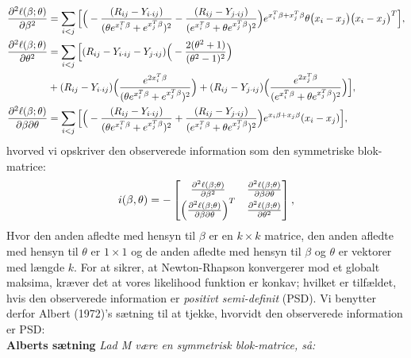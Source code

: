 \documentclass[11pt,a4paper]{article}
\begin{document}
\begin{align}
\frac{\partial^2 \ell(\beta;\theta)}{\partial \beta^2}
&= \sum_{i<j}\Big{[}\Big{(} -\frac{(R_{ij}-Y_{i\cdot ij})}{(\theta e^{x_i^T\beta}+e^{x_j^T\beta})^2}-\frac{(R_{ij}-Y_{j\cdot ij})}{(e^{x_i^T\beta}+\theta e^{x_j^T\beta})^2}\Big{)}e^{x_i^T\beta+x_j^T\beta}\theta\big{(}x_{i}-x_{j}\big{)}\big{(}x_{i}-x_{j}\big{)}^T\Big{]},\label{func:d2db2}\\
\frac{\partial^2 \ell(\beta;\theta)}{\partial \theta^2}
&= \sum_{i<j} 
\Big{[}
(R_{ij}-Y_{i\cdot ij}-Y_{j\cdot ij})\Big{(}-\frac{2(\theta^2+1)}{(\theta^2-1)^2}\Big{)}\\ \nonumber
&+(R_{ij}-Y_{i\cdot ij})\Big{(}\frac{e^{2x_i^T\beta}}{(\theta e^{x_i^T\beta}+e^{x_j^T\beta})^2}\Big{)}
+(R_{ij}-Y_{j\cdot ij})\Big{(}\frac{e^{2x_j^T\beta}}{(e^{x_i^T\beta}+\theta e^{x_j^T\beta})^2}\Big{)}\Big{]},\label{func:d2dt2}\\
\frac{\partial^2 \ell(\beta;\theta)}{\partial \beta\partial \theta}
&= \sum_{i<j}\Big{[}\Big{(}
-\frac{(R_{ij}-Y_{i \cdot ij})}{(\theta e^{x_i^T\beta}+e^{x_j^T\beta})^2}
+\frac{(R_{ij}-Y_{j \cdot ij})}{(e^{x_i^T\beta}+\theta e^{x_j^T\beta})^2}\Big{)}e^{x_i\beta+x_j\beta}(x_{i}-x_{j})\Big{]},\label{func:d2dbt}
\end{align}
hvorved vi opskriver den observerede information som den symmetriske blok-matrice:
\begin{align*}
i(\beta,\theta) = -\begin{bmatrix}
\frac{\partial^2 \ell(\beta;\theta)}{\partial \beta^2} &\frac{\partial^2 \ell(\beta;\theta)}{\partial \beta \partial \theta} \\
\Big{(}\frac{\partial^2 \ell(\beta;\theta)}{\partial \beta \partial \theta}\Big{)}^T & \frac{\partial^2 \ell(\beta;\theta)}{\partial \theta^2}
\end{bmatrix},
\label{inf}
\end{align*}
Hvor den anden afledte med hensyn til $\beta$ er en $k\times k$ matrice, den anden afledte med hensyn til $\theta$ er $1 \times 1$ og de anden afledte med hensyn til $\beta$ og $\theta$ er vektorer med længde $k$. 
For at sikrer, at Newton-Rhapson konvergerer mod et globalt maksima, kræver det at vores likelihood funktion er konkav; hvilket er tilfældet, hvis den observerede information er \textit{positivt semi-definit} (PSD). Vi benytter derfor Albert (1972)\cite{Albert}'s sætning til at tjekke, hvorvidt den observerede information er PSD:  \\\textbf{ Alberts sætning} \textit{Lad M være en symmetrisk blok-matrice, så:}
\end{document}
